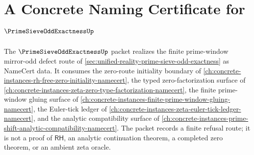 \chapter{A Concrete Naming Certificate for $\PrimeSieveOddExactnessUp$}
\label{ch:concrete-instances-prime-sieve-odd-exactness-namecert}

The $\PrimeSieveOddExactnessUp$ packet realizes the finite prime-window mirror-odd defect route of \autoref{sec:unified-reality-prime-sieve-odd-exactness} as NameCert data. It consumes the zero-route initiality boundary of \autoref{ch:concrete-instances-rh-free-zero-initiality-namecert}, the typed zero-factorization surface of \autoref{ch:concrete-instances-zeta-zero-type-factorization-namecert}, the finite prime-window gluing surface of \autoref{ch:concrete-instances-finite-prime-window-gluing-namecert}, the Euler-tick ledger of \autoref{ch:concrete-instances-zeta-euler-tick-ledger-namecert}, and the analytic compatibility surface of \autoref{ch:concrete-instances-prime-shift-analytic-compatibility-namecert}. The packet records a finite refusal route; it is not a proof of $\mathsf{RH}$, an analytic continuation theorem, a completed zero theorem, or an ambient zeta oracle.

